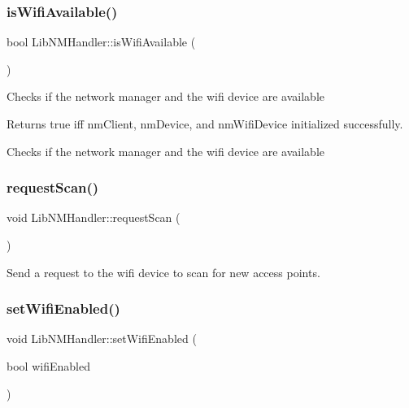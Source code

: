 \subsubsection{\texorpdfstring{is\+Wifi\+Available()}{isWifiAvailable()}}
{\footnotesize\ttfamily bool Lib\+N\+M\+Handler\+::is\+Wifi\+Available (\begin{DoxyParamCaption}{ }\end{DoxyParamCaption})\hspace{0.3cm}{\ttfamily [protected]}}

Checks if the network manager and the wifi device are available

\begin{DoxyReturn}{Returns}
true iff nm\+Client, nm\+Device, and nm\+Wifi\+Device initialized successfully.
\end{DoxyReturn}
Checks if the network manager and the wifi device are available \mbox{\label{classLibNMHandler_aa88624884963c3677b83a126898726b9}} 
\subsubsection{\texorpdfstring{request\+Scan()}{requestScan()}}
{\footnotesize\ttfamily void Lib\+N\+M\+Handler\+::request\+Scan (\begin{DoxyParamCaption}{ }\end{DoxyParamCaption})\hspace{0.3cm}{\ttfamily [protected]}}

Send a request to the wifi device to scan for new access points. \mbox{\label{classLibNMHandler_a3093d44da5d8f120474ff176d1416d07}} 
\subsubsection{\texorpdfstring{set\+Wifi\+Enabled()}{setWifiEnabled()}}
{\footnotesize\ttfamily void Lib\+N\+M\+Handler\+::set\+Wifi\+Enabled (\begin{DoxyParamCaption}\item[{bool}]{wifi\+Enabled }\end{DoxyParamCaption})\hspace{0.3cm}{\ttfamily [protected]}}

